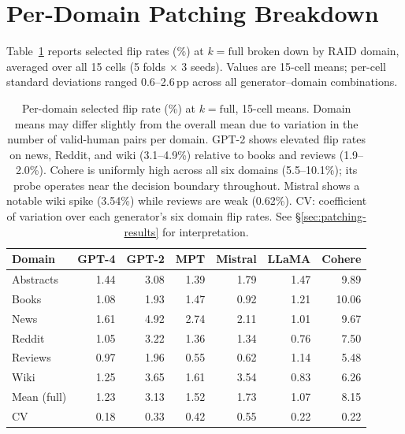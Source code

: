 \documentclass[11pt]{article}
\begin{document}
\section{Per-Domain Patching Breakdown}
\label{app:patching-perdomain}

Table~\ref{tab:perdomain} reports selected flip rates (\%) at $k = \text{full}$ broken down by RAID domain, averaged over all 15 cells (5 folds $\times$ 3 seeds). Values are 15-cell means; per-cell standard deviations ranged 0.6--2.6\,pp across all generator--domain combinations.

\begin{table}[!htbp]
\centering
\small
\begin{tabular}{lrrrrrr}
\toprule
Domain & GPT-4 & GPT-2 & MPT & Mistral & LLaMA & Cohere \\
\midrule
Abstracts & 1.44 & 3.08 & 1.39 & 1.79 & 1.47 &  9.89 \\
Books     & 1.08 & 1.93 & 1.47 & 0.92 & 1.21 & 10.06 \\
News      & 1.61 & 4.92 & 2.74 & 2.11 & 1.01 &  9.67 \\
Reddit    & 1.05 & 3.22 & 1.36 & 1.34 & 0.76 &  7.50 \\
Reviews   & 0.97 & 1.96 & 0.55 & 0.62 & 1.14 &  5.48 \\
Wiki      & 1.25 & 3.65 & 1.61 & 3.54 & 0.83 &  6.26 \\
\midrule
Mean (full) & 1.23 & 3.13 & 1.52 & 1.73 & 1.07 & 8.15 \\
\midrule
CV          & 0.18 & 0.33 & 0.42 & 0.55 & 0.22 & 0.22 \\
\bottomrule
\end{tabular}
\caption{Per-domain selected flip rate (\%) at $k = \text{full}$, 15-cell means. Domain means may differ slightly from the overall mean due to variation in the number of valid-human pairs per domain. GPT-2 shows elevated flip rates on news, Reddit, and wiki (3.1--4.9\%) relative to books and reviews (1.9--2.0\%). Cohere is uniformly high across all six domains (5.5--10.1\%); its probe operates near the decision boundary throughout. Mistral shows a notable wiki spike (3.54\%) while reviews are weak (0.62\%). CV: coefficient of variation over each generator's six domain flip rates. See §\ref{sec:patching-results} for interpretation.}
\label{tab:perdomain}
\end{table}
\end{document}
